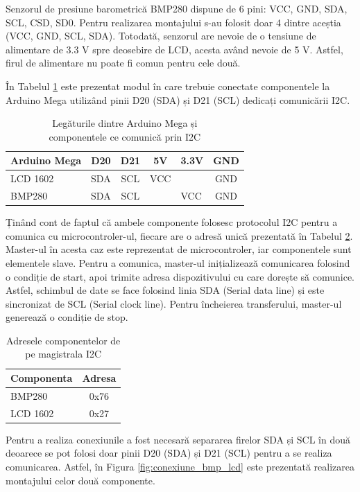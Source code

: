 Senzorul de presiune barometrică BMP280 dispune de 6 pini: VCC, GND, SDA, SCL, CSD, SD0. Pentru realizarea montajului s-au folosit doar 4 dintre aceștia (VCC, GND, SCL, SDA). Totodată, senzorul are nevoie de o tensiune de alimentare de 3.3 V spre deosebire de LCD, acesta având nevoie de 5 V. Astfel, firul de alimentare nu poate fi comun pentru cele două.

În Tabelul \ref{tab:conexiune_mega_lcd_bmp} este prezentat modul în care trebuie conectate componentele la Arduino Mega utilizând pinii D20 (SDA) și D21 (SCL) dedicați comunicării I2C.

\begin{table}[H]
\caption{Legăturile dintre Arduino Mega și \\componentele ce comunică prin I2C}
\label{tab:conexiune_mega_lcd_bmp}
\begin{tabular}{|l|c|c|c|l|c|}
\hline
Arduino Mega & D20 & D21 & 5V & 3.3V & GND \\ \hline
LCD 1602 & SDA & SCL & VCC & & GND \\ \hline
BMP280 & SDA & SCL & & VCC & GND \\ \hline
\end{tabular}
\end{table}

Ținând cont de faptul că ambele componente folosesc protocolul I2C pentru a comunica cu microcontroler-ul, fiecare are o adresă unică prezentată în Tabelul \ref{tab:adres_i2c}. Master-ul în acesta caz este reprezentat de microcontroler, iar componentele sunt elementele slave. Pentru a comunica, master-ul inițializează comunicarea folosind o condiție de start, apoi trimite adresa dispozitivului cu care dorește să comunice. Astfel, schimbul de date se face folosind linia SDA (Serial data line) și este sincronizat de SCL (Serial clock line). Pentru încheierea transferului, master-ul generează o condiție de stop. 

\begin{table}[H]
\caption{Adresele componentelor de pe magistrala I2C}
\label{tab:adres_i2c}
\begin{tabular}{|l|c|}
\hline
\textbf{Componenta} & \textbf{Adresa} \\ \hline
BMP280              & 0x76            \\ \hline
LCD 1602            & 0x27            \\ \hline
\end{tabular}
\end{table}

Pentru a realiza conexiunile a fost necesară separarea firelor SDA și SCL în două deoarece se pot folosi doar pinii D20 (SDA) și D21 (SCL) pentru a se realiza comunicarea. Astfel, în Figura \ref{fig:conexiune_bmp_lcd} este prezentată realizarea montajului celor două componente.

